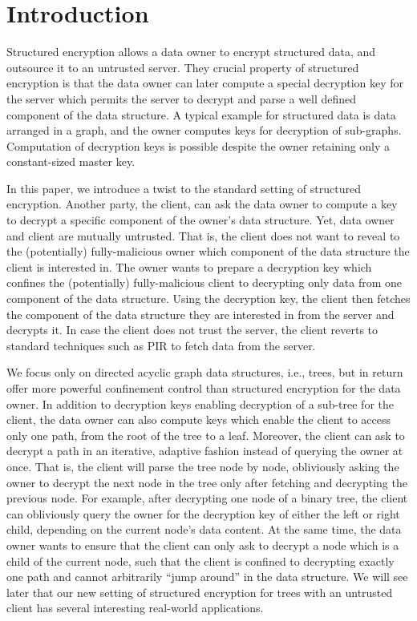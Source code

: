 \section{Introduction}
Structured encryption allows a data owner to encrypt structured data,
and outsource it to an untrusted server.  They crucial property of
structured encryption is that the data owner can later compute a
special decryption key for the server which permits the server to
decrypt and parse a well defined component of the data structure.  A
typical example for structured data is data arranged in a graph, and
the owner computes keys for decryption of sub-graphs.  Computation of
decryption keys is possible despite the owner retaining only a
constant-sized master key.

In this paper, we introduce a twist to the standard setting of
structured encryption. Another party, the client, can ask the data
owner to compute a key to decrypt a specific component of the owner's
data structure. Yet, data owner and client are mutually
untrusted. That is, the client does not want to reveal to the
(potentially) fully-malicious owner which component of the data
structure the client is interested in. The owner wants to prepare a
decryption key which confines the (potentially) fully-malicious client
to decrypting only data from one component of the data
structure. Using the decryption key, the client then fetches the
component of the data structure they are interested in from the server
and decrypts it. In case the client does not trust the server, the
client reverts to standard techniques such as PIR to fetch data from
the server.

We focus only on directed acyclic graph data structures, i.e., trees,
but in return offer more powerful confinement control than structured
encryption for the data owner.  In addition to decryption keys
enabling decryption of a sub-tree for the client, the data owner can
also compute keys which enable the client to access only one path,
from the root of the tree to a leaf.  Moreover, the client can ask to
decrypt a path in an iterative, adaptive fashion instead of querying
the owner at once.  That is, the client will parse the tree node by
node, obliviously asking the owner to decrypt the next node in the
tree only after fetching and decrypting the previous node.  For
example, after decrypting one node of a binary tree, the client can
obliviously query the owner for the decryption key of either the left
or right child, depending on the current node's data content.  At the
same time, the data owner wants to ensure that the client can only ask
to decrypt a node which is a child of the current node, such that the
client is confined to decrypting exactly one path and cannot
arbitrarily ``jump around'' in the data structure.  We will see later
that our new setting of structured encryption for trees with an
untrusted client has several interesting real-world applications.

